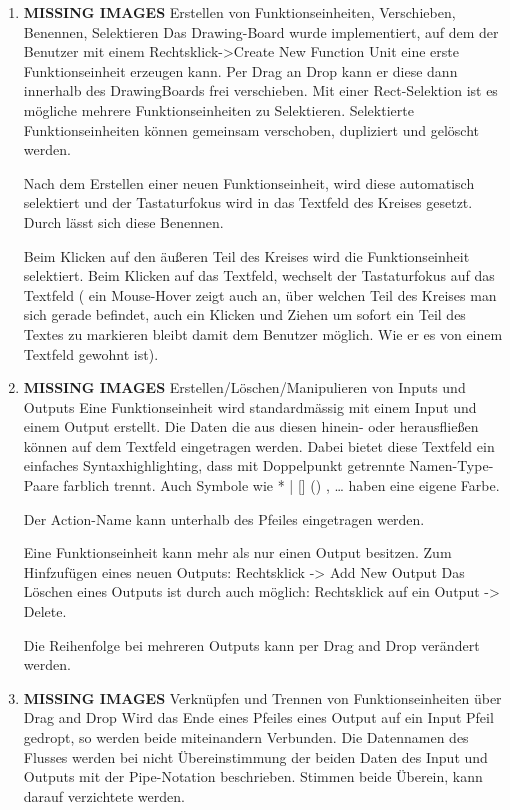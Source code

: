\begin{enumerate}
	\item {\bfseries\sffamily MISSING IMAGES} Erstellen von Funktionseinheiten, Verschieben, Benennen, Selektieren
	\label{sec:orgheadline15}
	Das Drawing-Board wurde implementiert, auf dem der Benutzer mit einem
	Rechtsklick->Create New Function Unit eine erste Funktionseinheit erzeugen
	kann. Per Drag an Drop kann er diese dann innerhalb des DrawingBoards frei
	verschieben. Mit einer Rect-Selektion ist es mögliche mehrere
	Funktionseinheiten zu Selektieren. Selektierte Funktionseinheiten können
	gemeinsam verschoben, dupliziert und gelöscht werden.
	
	Nach dem Erstellen einer neuen Funktionseinheit, wird diese automatisch
	selektiert und der Tastaturfokus wird in das Textfeld des Kreises gesetzt.
	Durch lässt sich diese Benennen.
	
	Beim Klicken auf den äußeren Teil des Kreises wird die Funktionseinheit
	selektiert. Beim Klicken auf das Textfeld, wechselt der Tastaturfokus auf
	das Textfeld ( ein Mouse-Hover zeigt auch an, über welchen Teil des Kreises
	man sich gerade befindet, auch ein Klicken und Ziehen um sofort ein Teil
	des Textes zu markieren bleibt damit dem Benutzer möglich. Wie er es von
	einem Textfeld gewohnt ist).
	
	
	\item {\bfseries\sffamily MISSING IMAGES} Erstellen/Löschen/Manipulieren von Inputs und Outputs
	\label{sec:orgheadline16}
	Eine Funktionseinheit wird standardmässig mit einem Input und einem Output
	erstellt. Die Daten die aus diesen hinein- oder herausfließen können auf
	dem Textfeld eingetragen werden. Dabei bietet diese Textfeld ein einfaches
	Syntaxhighlighting, dass mit Doppelpunkt getrennte Namen-Type-Paare
	farblich trennt. Auch Symbole wie * | [] () , \ldots{} haben eine eigene Farbe.
	
	Der Action-Name kann unterhalb des Pfeiles eingetragen werden.
	
	Eine Funktionseinheit kann mehr als nur einen Output besitzen.
	Zum Hinfzufügen eines neuen Outputs: Rechtsklick -> Add New Output
	Das Löschen eines Outputs ist durch auch möglich: Rechtsklick auf ein
	Output -> Delete.    
	
	Die Reihenfolge bei mehreren Outputs kann per Drag and Drop verändert werden.
	
	\item {\bfseries\sffamily MISSING IMAGES} Verknüpfen und Trennen von Funktionseinheiten über Drag and Drop
	\label{sec:orgheadline17}
	Wird das Ende eines Pfeiles eines Output auf ein Input Pfeil gedropt, so werden beide
	miteinandern Verbunden. Die Datennamen des Flusses werden bei nicht
	Übereinstimmung der beiden Daten des Input und Outputs mit
	der Pipe-Notation beschrieben. Stimmen beide Überein, kann darauf
	verzichtete werden.
	

\end{enumerate}
